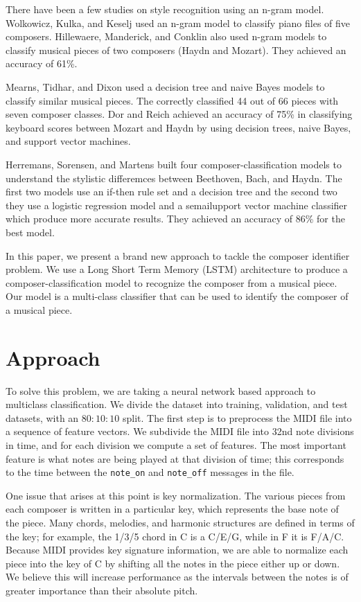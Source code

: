 \documentclass[11pt,a4paper]{article}
\begin{document}
There have been a few studies on style recognition using an n-gram model. Wolkowicz, Kulka, and Keselj \cite{n-gram} used an n-gram model to classify piano files of five composers.  Hillewaere, Manderick, and Conklin \cite{Hillewaere} also used n-gram models to classify musical pieces of two composers (Haydn and Mozart). They achieved an accuracy of 61\%.

Mearns, Tidhar, and Dixon \cite{Mearns} used a decision tree and naive Bayes models to classify similar musical pieces. The correctly classified 44 out of 66 pieces with seven composer classes. Dor and Reich \cite{Dor} achieved an accuracy of 75\% in classifying keyboard scores between Mozart and Haydn by using decision trees, naive Bayes, and support vector machines.

Herremans, Sorensen, and Martens \cite {Herremans} built four composer-classification models to understand the stylistic differemces between Beethoven, Bach, and Haydn. The first two models use an if-then rule set and a decision tree and the second two they use a logistic regression model and a semailupport vector machine classifier which produce more accurate results. They achieved an accuracy of 86\% for the best model. 

In this paper, we present a brand new approach to tackle the composer identifier problem. We use a Long Short Term Memory (LSTM) architecture to produce a composer-classification model to recognize the composer from a musical piece. Our model is a multi-class classifier that can be used to identify the composer of a musical piece. 


\section{Approach}
To solve this problem, we are taking a neural network based approach to multiclass classification. We divide the dataset into training, validation, and test datasets, with an $80:10:10$ split. The first step is to preprocess the MIDI file into a sequence of feature vectors. We subdivide the MIDI file into 32nd note divisions in time, and for each division we compute a set of features. The most important feature is what notes are being played at that division of time; this corresponds to the time between the \texttt{note\_on}  and \texttt{note\_off}  messages in the file. 

One issue that arises at this point is key normalization. The various pieces from each composer is written in a particular key, which represents the base note of the piece. Many chords, melodies, and harmonic structures are defined in terms of the key; for example, the 1/3/5 chord in C is a C/E/G, while in F it is F/A/C. Because MIDI provides key signature information, we are able to normalize each piece into the key of C by shifting all the notes in the piece either up or down. We believe this will increase performance as the intervals between the notes is of greater importance than their absolute pitch.
\end{document}
